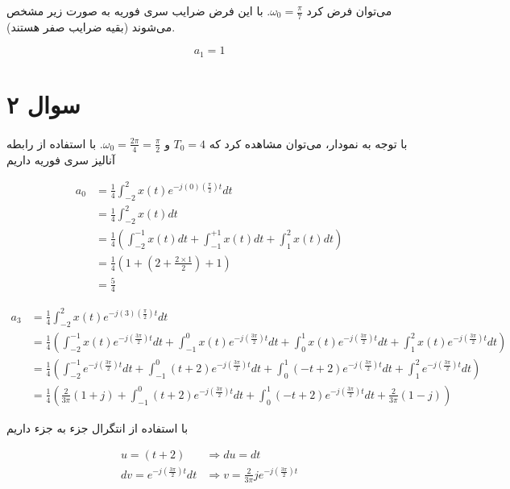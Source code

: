 \documentclass{article}
\begin{document}
	می‌توان فرض کرد
	$\omega_0 = \frac{\pi}{7}$.
	با این فرض ضرایب سری فوریه به صورت زیر مشخص می‌شوند (بقیه ضرایب صفر هستند).

	\begin{equation*}
		a_1 = 1
	\end{equation*}

	\section*{سوال ۲}
	\paragraph*{}
	با توجه به نمودار، می‌توان مشاهده کرد که
	$T_0 = 4$
	و
	$\omega_0 = \frac{2\pi}{4} = \frac{\pi}{2}$.
	با استفاده از رابطه آنالیز سری فوریه داریم

	\begin{align*}
		a_0 &= \frac{1}{4} \int_{-2}^{2} x(t) e^{-j(0)(\frac{\pi}{2})t} dt \\
		&= \frac{1}{4} \int_{-2}^{2} x(t) dt \\
		&= \frac{1}{4} \left(\int_{-2}^{-1} x(t) dt + \int_{-1}^{+1} x(t) dt + \int_{1}^{2} x(t) dt \right) \\
		&= \frac{1}{4} \left( 1 + (2 + \frac{2 \times 1}{2}) + 1\right) \\
		&= \frac{5}{4}
	\end{align*}

	\begin{align*}
		a_3 &= \frac{1}{4} \int_{-2}^{2} x(t) e^{-j(3)(\frac{\pi}{2})t} dt \\
		&= \frac{1}{4} \left(\int_{-2}^{-1} x(t) e^{-j(\frac{3\pi}{2})t} dt
		+ \int_{-1}^{0} x(t) e^{-j(\frac{3\pi}{2})t} dt
		+ \int_{0}^{1} x(t) e^{-j(\frac{3\pi}{2})t} dt
		+ \int_{1}^{2} x(t) e^{-j(\frac{3\pi}{2})t} dt \right) \\
		&= \frac{1}{4} \left(\int_{-2}^{-1} e^{-j(\frac{3\pi}{2})t} dt
		+ \int_{-1}^{0} (t+2) e^{-j(\frac{3\pi}{2})t} dt
		+ \int_{0}^{1} (-t+2) e^{-j(\frac{3\pi}{2})t} dt
		+ \int_{1}^{2} e^{-j(\frac{3\pi}{2})t} dt \right) \\
		&= \frac{1}{4} \left( \frac{2}{3\pi} (1+j)
		+ \int_{-1}^{0} (t+2) e^{-j(\frac{3\pi}{2})t} dt
		+ \int_{0}^{1} (-t+2) e^{-j(\frac{3\pi}{2})t} dt
		+ \frac{2}{3\pi} (1-j)
		 \right)
	\end{align*}

	با استفاده از انتگرال جزء به جزء داریم

	\begin{align*}
		u = (t+2) &\Rightarrow du = dt \\
		dv = e^{-j(\frac{3\pi}{2})t} dt &\Rightarrow
		v = \frac{2}{3\pi} j e^{-j(\frac{3\pi}{2})t}
	\end{align*}
\end{document}
